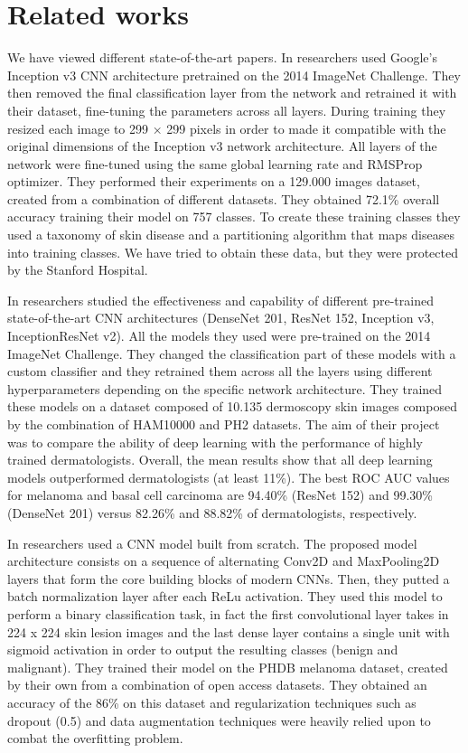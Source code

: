 \section{Related works}
	We have viewed different state-of-the-art papers. 
	In \cite{article1} researchers used Google’s Inception v3 CNN architecture pretrained on the 2014 ImageNet Challenge. They then removed the final classification layer from the network and retrained it with their dataset, fine-tuning the parameters across all layers. During training they resized each image to 299 ×  299 pixels in order to made it compatible with the original dimensions of the Inception v3 network architecture. All layers of the network were fine-tuned using the same global learning rate and RMSProp optimizer. They performed their experiments on a 129.000 images dataset, created from a combination of different datasets. They obtained 72.1\% overall accuracy training their model on 757 classes. To create these training classes they used a taxonomy of skin disease and a partitioning algorithm that maps diseases into training classes. We have tried to obtain these data, but they were protected by the Stanford Hospital.
	
	\smallskip
	
	In \cite{article3} researchers studied the effectiveness and capability of different pre-trained state-of-the-art CNN architectures (DenseNet 201, ResNet 152, Inception v3, InceptionResNet v2). All the models they used were pre-trained on the 2014 ImageNet Challenge. They changed the classification part of these models with a custom classifier and they retrained them across all the layers using different hyperparameters depending on the specific network architecture. They trained these models on a dataset composed of 10.135 dermoscopy skin images composed by the combination of HAM10000 and PH2 datasets.  The aim of their project was to compare the ability of deep learning with the performance of highly trained dermatologists. Overall, the mean results show that all deep learning models outperformed dermatologists (at least 11\%). The best ROC AUC values for melanoma and basal cell carcinoma are 94.40\% (ResNet 152) and 99.30\% (DenseNet 201) versus 82.26\% and 88.82\% of dermatologists, respectively.
	
	\smallskip

	In \cite{article2} researchers used a CNN model built from scratch. The proposed model architecture consists on a sequence of alternating Conv2D and MaxPooling2D layers that form the core building blocks of modern CNNs. Then, they putted a batch normalization layer after each ReLu activation. They used this model to perform a binary classification task, in fact the first convolutional layer takes in 224 x 224 skin lesion images and the last dense layer contains a single unit with sigmoid activation in order to output the resulting classes (benign and malignant). They trained their model on the PHDB melanoma dataset, created by their own from a combination of open access datasets. They obtained an accuracy of the 86\% on this dataset and regularization techniques such as dropout (0.5) and data augmentation techniques were heavily relied upon to combat the overfitting problem.
	
